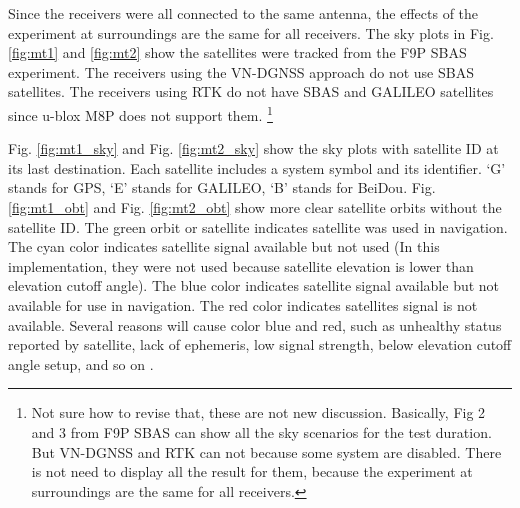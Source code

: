 \documentclass[letterpaper, 10 pt,onecolumn]{article}
\begin{document}
	Since the receivers were all connected to the same antenna, the effects of the experiment at surroundings are the same for all receivers. 
	The sky plots in Fig. \ref{fig:mt1} and \ref{fig:mt2} show the satellites were tracked from the F9P SBAS experiment. \red The receivers using the VN-DGNSS approach do not use SBAS satellites. The receivers using RTK do not have SBAS and GALILEO satellites since u-blox M8P does not support them. \footnote{\red Not sure how to revise that, these are not new discussion. Basically, Fig 2 and 3 from F9P SBAS can show all the sky scenarios for the test duration. But VN-DGNSS and RTK can not because some system are disabled. There is not need to display all the result for them, because the experiment at surroundings are the same for all receivers.}
	\black
	
	Fig. \ref{fig:mt1_sky} and Fig. \ref{fig:mt2_sky} show the sky plots with satellite ID at its last destination. Each satellite includes a system symbol and its identifier. `G' stands for GPS, `E' stands for GALILEO, `B' stands for BeiDou. Fig. \ref{fig:mt1_obt} and Fig. \ref{fig:mt2_obt} show more clear satellite orbits without the satellite ID. The green orbit or satellite indicates satellite was used in navigation. The cyan color indicates satellite signal available but not used (In this implementation, they were not used because satellite elevation is lower than elevation cutoff angle). The blue color indicates satellite signal available but not available for use in navigation. The red color indicates satellites signal is not available. Several reasons will cause color blue and red, such as unhealthy status reported by satellite, lack of ephemeris, low signal strength, below elevation cutoff angle setup, and so on \cite{ucenter}. 
	
\end{document}
